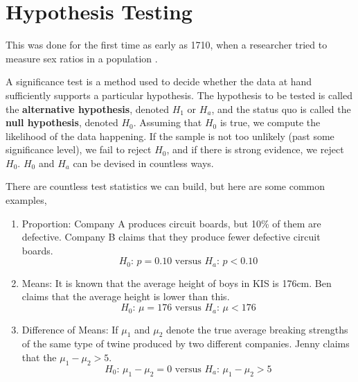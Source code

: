 \section{Hypothesis Testing}

  This was done for the first time as early as 1710, when a researcher tried to measure sex ratios in a population \cite{1710arbuthnot}. 
  
  A significance test is a method used to decide whether the data at hand sufficiently supports a particular hypothesis. The hypothesis to be tested is called the \textbf{alternative hypothesis}, denoted $H_1$ or $H_a$, and the status quo is called the \textbf{null hypothesis}, denoted $H_0$. Assuming that $H_0$ is true, we compute the likelihood of the data happening. If the sample is not too unlikely (past some significance level), we fail to reject $H_0$, and if there is strong evidence, we reject $H_0$. $H_0$ and $H_a$ can be devised in countless ways. 

  \begin{example}
    There are countless test statistics we can build, but here are some common examples, 
    \begin{enumerate}
      \item Proportion: Company A produces circuit boards, but 10\% of them are defective. Company B claims that they produce fewer defective circuit boards. 
      \begin{equation}
        H_0 : \, p = 0.10 \text{ versus } H_a : \, p < 0.10
      \end{equation}
      
      \item Means: It is known that the average height of boys in KIS is 176cm. Ben claims that the average height is lower than this. 
      \begin{equation}
        H_0 : \, \mu = 176 \text{ versus } H_a : \, \mu < 176
      \end{equation}
      
      \item Difference of Means: If $\mu_1$ and $\mu_2$ denote the true average breaking strengths of the same type of twine produced by two different companies. Jenny claims that the $\mu_1 - \mu_2 > 5$. 
      \begin{equation}
        H_0 : \, \mu_1 - \mu_2 = 0 \text{ versus } H_a : \, \mu_1 - \mu_2 > 5
      \end{equation}
    \end{enumerate}
  \end{example}

